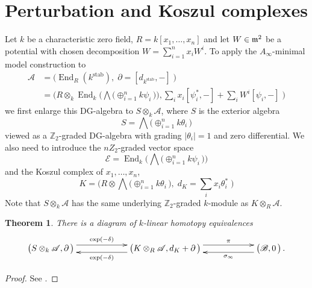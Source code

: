 \documentclass[english,letter paper,12pt,leqno]{article}
\newtheorem{theorem}{Theorem}[section]
\theoremstyle{example}
\numberwithin{equation}{section}
\def\stab{\operatorname{stab}}
\def\be{\begin{equation}}
\def\ee{\end{equation}}
\def\nZ{\mathds{Z}}
\DeclareMathOperator{\End}{End}
\begin{document}
\section{Perturbation and Koszul complexes}

Let $k$ be a characteristic zero field, $R =  k[x_1,\ldots,x_n]$ and let $W \in \mathfrak{m}^2$ be a potential with chosen decomposition $W = \sum_{i=1}^n x_i W^i$. To apply the $A_\infty$-minimal model construction to
\begin{align*}
\mathscr{A} &= \Big( \End_{R}(k^{\operatorname{stab}}), \; \partial = [d_{k^{\stab}},-] \; \Big)\\
&= \Big( R \otimes_k \End_k\Big( \bigwedge\big( \oplus_{i=1}^n k\psi_i \,\big) \Big),  \sum_i x_i [\psi_i^*,-] + \sum_i W^i [\psi_i,-] \;\Big)
\end{align*}
we first enlarge this DG-algebra to $S \otimes_k \mathscr{A}$, where $S$ is the exterior algebra
\be
S = \bigwedge\big( \oplus_{i=1}^n k\theta_i \,\big)
\ee
viewed as a $\nZ_2$-graded DG-algebra with grading $|\theta_i| = 1$ and zero differential. We also need to introduce the $nZ_2$-graded vector space
\be
\mathscr{E} = \End_k\Big( \bigwedge\big( \oplus_{i=1}^n k \psi_i \,\big) \Big)
\ee
and the Koszul complex of $x_1,\ldots,x_n$,
\be\label{eq:defnkoszulK}
K = \Big( R \otimes \bigwedge\big( \oplus_{i=1}^n k \theta_i \,\big), \; d_K = \sum_i x_i \theta_i^*\; \Big)
\ee
Note that $S \otimes_k \mathscr{A}$ has the same underlying $\nZ_2$-graded $k$-module as $K \otimes_R \mathscr{A}$.

\begin{theorem} There is a diagram of $k$-linear homotopy equivalences
\be\label{eq:first_he}
\xymatrix@C+3pc{
\big( S \otimes_k \mathscr{A}, \partial \,\big) \ar@<1ex>[r]^-{\exp(-\delta)} & \big( K \otimes_R \mathscr{A}, d_K + \partial \,\big) \ar@<1ex>[l]^-{ \exp(-\delta) } \ar@<1ex>[r]^-{\pi} & \big( \mathscr{B}, 0 \,\big)\,.\ar@<1ex>[l]^-{ \sigma_\infty }
}
\ee
\end{theorem}
\begin{proof}
See \cite{murfet}.
\end{proof}
\end{document}
